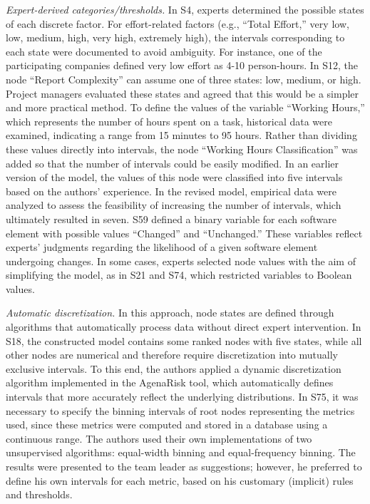 \textit{Expert-derived categories/thresholds.} In S4, experts determined the possible states of each discrete factor. For effort-related factors (e.g., ``Total Effort,'' very low, low, medium, high, very high, extremely high), the intervals corresponding to each state were documented to avoid ambiguity. For instance, one of the participating companies defined very low effort as 4-10 person-hours. In S12, the node ``Report Complexity'' can assume one of three states: low, medium, or high. Project managers evaluated these states and agreed that this would be a simpler and more practical method. To define the values of the variable ``Working Hours,'' which represents the number of hours spent on a task, historical data were examined, indicating a range from 15 minutes to 95 hours. Rather than dividing these values directly into intervals, the node ``Working Hours Classification'' was added so that the number of intervals could be easily modified. In an earlier version of the model, the values of this node were classified into five intervals based on the authors' experience. In the revised model, empirical data were analyzed to assess the feasibility of increasing the number of intervals, which ultimately resulted in seven. S59 defined a binary variable for each software element with possible values ``Changed'' and ``Unchanged.'' These variables reflect experts' judgments regarding the likelihood of a given software element undergoing changes. In some cases, experts selected node values with the aim of simplifying the model, as in S21 and S74, which restricted variables to Boolean values.

\textit{Automatic discretization.} In this approach, node states are defined through algorithms that automatically process data without direct expert intervention. In S18, the constructed model contains some ranked nodes with five states, while all other nodes are numerical and therefore require discretization into mutually exclusive intervals. To this end, the authors applied a dynamic discretization algorithm implemented in the AgenaRisk tool, which automatically defines intervals that more accurately reflect the underlying distributions. In S75, it was necessary to specify the binning intervals of root nodes representing the metrics used, since these metrics were computed and stored in a database using a continuous range. The authors used their own implementations of two unsupervised algorithms: equal-width binning and equal-frequency binning. The results were presented to the team leader as suggestions; however, he preferred to define his own intervals for each metric, based on his customary (implicit) rules and thresholds.

